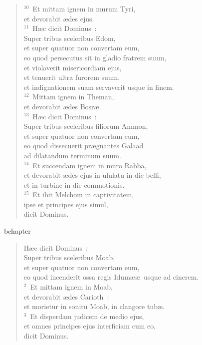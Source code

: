 \begin{verse}
${}^{10}$~Et mittam ignem in murum Tyri,\\ et devorabit \ae des ejus.\\
${}^{11}$~H\ae c dicit Dominus~:\\ Super tribus sceleribus Edom,\\ et super quatuor non convertam eum,\\ eo quod persecutus sit in gladio fratrem suum,\\ et violaverit misericordiam ejus,\\ et tenuerit ultra furorem suum,\\ et indignationem suam servaverit usque in finem.\\
${}^{12}$~Mittam ignem in Theman,\\ et devorabit \ae des Bosr\ae .\\
${}^{13}$~H\ae c dicit Dominus~:\\ Super tribus sceleribus filiorum Ammon,\\ et super quatuor non convertam eum,\\ eo quod dissecuerit pr\ae gnantes Galaad\\ ad dilatandum terminum suum.\\
${}^{14}$~Et succendam ignem in muro Rabba,\\ et devorabit \ae des ejus in ululatu in die belli,\\ et in turbine in die commotionis.\\
${}^{15}$~Et ibit Melchom in captivitatem,\\ ipse et principes ejus simul,\\ dicit Dominus.\end{verse}


bchapter\begin{verse}\vspace{-19pt}H\ae c dicit Dominus~:\\ Super tribus sceleribus Moab,\\ et super quatuor non convertam eum,\\ eo quod incenderit ossa regis Idum\ae \ae\ usque ad cinerem.\\
${}^{2}$~Et mittam ignem in Moab,\\ et devorabit \ae des Carioth~:\\ et morietur in sonitu Moab, in clangore tub\ae .\\
${}^{3}$~Et disperdam judicem de medio ejus,\\ et omnes principes ejus interficiam cum eo,\\ dicit Dominus.\end{verse}


